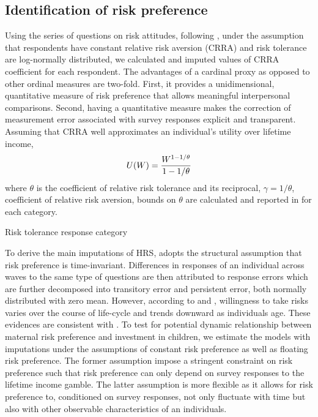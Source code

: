 \documentclass[emulatestandardclasses, 10pt, abstract = true]{scrartcl}
\begin{document}
\subsection{Identification of risk preference}

Using the series of questions on risk attitudes, following \citet{kimball2008imputing,kimball2009risk}, under the assumption that respondents have constant relative risk aversion (CRRA) and risk tolerance are log-normally distributed, we calculated and imputed values of CRRA coefficient for each respondent. The advantages of a cardinal proxy as opposed to other ordinal measures are two-fold. First, it provides a unidimensional, quantitative measure of risk preference that allows meaningful interpersonal comparisons. Second, having a quantitative measure makes the correction of measurement error associated with survey responses explicit and transparent. Assuming that CRRA well approximates an individual's utility over lifetime income,
\[U(W)={W^{1-{1/\theta}}\over 1-{1/\theta}}\]
where $\theta$ is the coefficient of relative risk tolerance and its reciprocal, $\gamma = 1/\theta$, coefficient of relative risk aversion, bounds on $\theta$ are calculated and reported in  for each category. 

\begin{table}[!b]
	\centering
	\setlength{\extrarowheight}{0.3em}
	\caption{Risk tolerance response category}	
	
	\label{table:risk-bound}
\end{table}

To derive the main imputations of HRS, \citet{kimball2008imputing} adopts the structural assumption that risk preference is time-invariant. Differences in responses of an individual across waves to the same type of questions are then attributed to response errors which are further decomposed into transitory error and persistent error, both normally distributed with zero mean. However, according to \citet{dohmen2011individual} and \citet{dohmen2017risk}, willingness to take risks varies over the course of life-cycle and trends downward as individuals age. These evidences are consistent with \citet{sahm2012much}. To test for potential dynamic relationship between maternal risk preference and investment in children, we estimate the models with imputations under the assumptions of constant risk preference as well as floating risk preference. The former assumption impose a stringent constraint on risk preference such that risk preference can only depend on survey responses to the lifetime income gamble. The latter assumption is more flexible as it allows for risk preference to, conditioned on survey responses, not only fluctuate with time but also with other observable characteristics of an individuals.  
\end{document}
